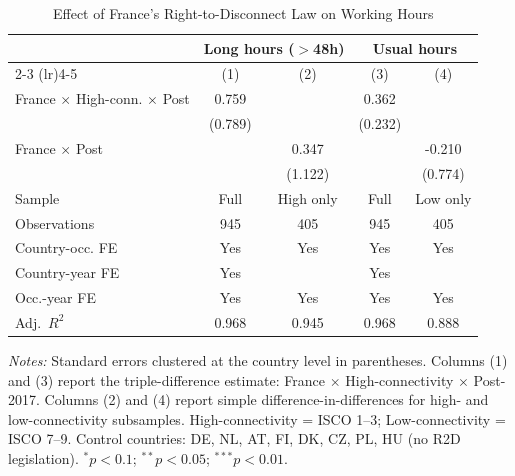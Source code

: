 \begin{table}[htbp]
\centering
\caption{Effect of France's Right-to-Disconnect Law on Working Hours}
\label{tab:main}
\begin{tabular}{lcccc}
\toprule
 & \multicolumn{2}{c}{Long hours ($>$48h)} & \multicolumn{2}{c}{Usual hours} \\
\cmidrule(lr){2-3} \cmidrule(lr){4-5}
 & (1) & (2) & (3) & (4) \\
\midrule
France $\times$ High-conn. $\times$ Post & 0.759 & & 0.362 & \\
 & (0.789) & & (0.232) & \\
\addlinespace
France $\times$ Post & & 0.347 & & -0.210 \\
 & & (1.122) & & (0.774) \\
\addlinespace
\midrule
Sample & Full & High only & Full & Low only \\
Observations & 945 & 405 & 945 & 405 \\
Country-occ. FE & Yes & Yes & Yes & Yes \\
Country-year FE & Yes & & Yes & \\
Occ.-year FE & Yes & Yes & Yes & Yes \\
Adj.\ $R^2$ & 0.968 & 0.945 & 0.968 & 0.888 \\
\bottomrule
\end{tabular}
\begin{tablenotes}
\small
\item \textit{Notes:} Standard errors clustered at the country level in parentheses.
Columns (1) and (3) report the triple-difference estimate: France $\times$ High-connectivity $\times$ Post-2017.
Columns (2) and (4) report simple difference-in-differences for high- and low-connectivity subsamples.
High-connectivity = ISCO 1--3; Low-connectivity = ISCO 7--9.
Control countries: DE, NL, AT, FI, DK, CZ, PL, HU (no R2D legislation).
$^{*}p<0.1$; $^{**}p<0.05$; $^{***}p<0.01$.
\end{tablenotes}
\end{table}
